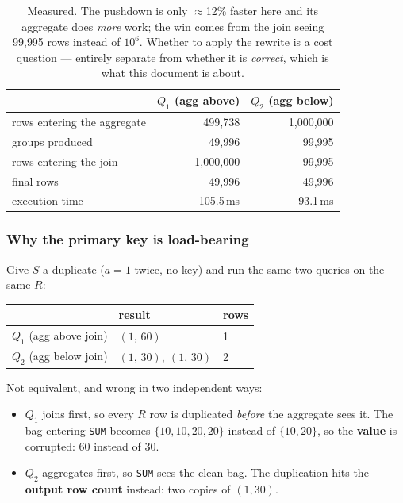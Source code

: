 \begin{table}[h]\centering\small
\begin{tabular}{@{}lrr@{}}
\toprule
 & $Q_1$ (agg above) & $Q_2$ (agg below)\\
\midrule
rows entering the aggregate & 499{,}738 & 1{,}000{,}000\\
groups produced             & 49{,}996  & 99{,}995\\
rows entering the join      & 1{,}000{,}000 & 99{,}995\\
final rows                  & 49{,}996  & 49{,}996\\
execution time              & 105.5\,ms & 93.1\,ms\\
\bottomrule
\end{tabular}
\caption{Measured. The pushdown is only $\approx$12\% faster here and its aggregate does
\emph{more} work; the win comes from the join seeing 99{,}995 rows instead of $10^6$.
Whether to apply the rewrite is a cost question --- entirely separate from whether it is
\emph{correct}, which is what this document is about.}
\end{table}

\subsubsection{Why the primary key is load-bearing}
\label{sec:pkcounter}

Give $S$ a duplicate ($a=1$ twice, no key) and run the same two queries on the same $R$:

\begin{center}\small
\begin{tabular}{@{}lll@{}}
\toprule
 & result & rows\\\midrule
$Q_1$ (agg above join) & $(1,\,60)$ & 1\\
$Q_2$ (agg below join) & $(1,\,30),\ (1,\,30)$ & 2\\
\bottomrule
\end{tabular}
\end{center}

Not equivalent, and wrong in two independent ways:

\begin{itemize}
\item $Q_1$ joins first, so every $R$ row is duplicated \emph{before} the aggregate sees
      it. The bag entering \lstinline|SUM| becomes $\{10,10,20,20\}$ instead of
      $\{10,20\}$, so the \textbf{value} is corrupted: $60$ instead of $30$.
\item $Q_2$ aggregates first, so \lstinline|SUM| sees the clean bag. The duplication hits
      the \textbf{output row count} instead: two copies of $(1,30)$.
\end{itemize}

